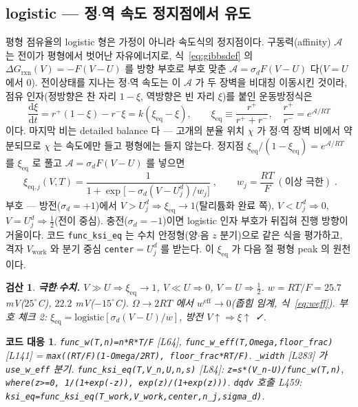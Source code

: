 \documentclass[11pt,a4paper]{article}
\newtheorem*{codebox}{코드 대응}
\newtheorem*{verifybox}{검산}
\newcommand{\dd}{\mathrm{d}}
\newcommand{\eff}{\mathrm{eff}}
\newcommand{\eq}{\mathrm{eq}}
\newcommand{\work}{\mathrm{work}}
\newcommand{\sgn}{\sigma_d}
\begin{document}
\subsection{logistic — 정$\cdot$역 속도 정지점에서 유도}
평형 점유율의 logistic 형은 가정이 아니라 속도식의 정지점이다. 구동력(affinity) $\mathcal A$ 는 전이가 평형에서 벗어난 자유에너지로, 식~\eqref{eq:gibbsdef} 의 $\Delta G_{\mathrm{rxn}}(V)=-F(V-U)$ 를 방향 부호로 부호 맞춘 $\mathcal A=\sgn F(V-U)$ 다($V=U$ 에서 $0$). 전이상태를 지나는 정$\cdot$역 속도는 이 $\mathcal A$ 가 두 장벽을 비대칭 이동시킨 것이라, 점유 인자(정방향은 찬 자리 $1-\xi$, 역방향은 빈 자리 $\xi$)를 붙인 운동방정식은
\begin{equation}
\frac{\dd\xi}{\dd t}=r^+(1-\xi)-r^-\xi=k(\xi_\eq-\xi),\qquad
\xi_\eq\equiv\frac{r^+}{r^++r^-},\quad \frac{r^+}{r^-}=e^{\mathcal A/RT}
\label{eq:relax}
\end{equation}
이다. 마지막 비는 detailed balance 다 — 고개의 분율 위치 $\chi$ 가 정$\cdot$역 장벽 비에서 약분되므로 $\chi$ 는 속도에만 들고 평형에는 들지 않는다. 정지점 $\xi_\eq/(1-\xi_\eq)=e^{\mathcal A/RT}$ 를 $\xi_\eq$ 로 풀고 $\mathcal A=\sgn F(V-U)$ 를 넣으면
\begin{equation}
\boxed{\;\xi_{\eq,j}(V,T)=\frac{1}{1+\exp\!\big[-\sgn(V-U_j^d)/w_j\big]}\;,\qquad
w_j=\frac{RT}{F}\ (\text{이상 극한})\;.}
\label{eq:logistic}
\end{equation}
부호 — 방전($\sgn=+1$)에서 $V>U_j^d\Rightarrow\xi_\eq\to1$(탈리튬화 완료 쪽), $V<U_j^d\Rightarrow0$, $V=U_j^d\Rightarrow\tfrac12$(전이 중심). 충전($\sgn=-1$)이면 logistic 인자 부호가 뒤집혀 진행 방향이 거울이다. 코드 \texttt{func\_ksi\_eq} 는 수치 안정형(양$\cdot$음 $z$ 분기)으로 같은 식을 평가하고, 격자 $V_\work$ 와 분기 중심 \texttt{center}$=U_j^d$ 를 받는다. 이 $\xi_\eq$ 가 다음 절 평형 peak 의 원천이다.

\begin{verifybox}
\textbf{극한$\cdot$수치.} $V\gg U\Rightarrow\xi_\eq\to1$, $V\ll U\Rightarrow0$, $V=U\Rightarrow\tfrac12$. $w=RT/F=25.7$ mV($25^\circ$C), $22.2$ mV($-15^\circ$C). $\Omega\to2RT$ 에서 $w^\eff\to0$(좁힘 임계, 식~\eqref{eq:weff}). 부호 체크 2: $\xi_\eq=\mathrm{logistic}[\sgn(V-U)/w]$, 방전 $V\!\uparrow\Rightarrow\xi\!\uparrow$ ✓.
\end{verifybox}

\begin{codebox}
\texttt{func\_w(T,n)=n*R*T/F} [L64], \texttt{func\_w\_eff(T,Omega,floor\_frac)} [L141] = \texttt{max((RT/F)(1-Omega/2RT), floor\_frac*RT/F)}. \texttt{\_width} [L283] 가 \texttt{use\_w\_eff} 분기. \texttt{func\_ksi\_eq(T,V\_n,U,n,s)} [L84]: \texttt{z=s*(V\_n-U)/func\_w(T,n)}, \texttt{where(z>=0, 1/(1+exp(-z)), exp(z)/(1+exp(z)))}. \texttt{dqdv} 호출 L459: \texttt{ksi\_eq=func\_ksi\_eq(T\_work,V\_work,center,n\_j,sigma\_d)}.
\end{codebox}
\end{document}
